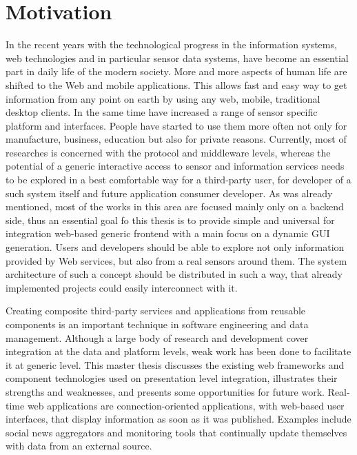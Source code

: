 \section{Motivation}
     In the recent years with the technological progress in the information systems, web technologies and in particular sensor data systems, have become an essential part in daily life of the modern society. More and more aspects of human life are shifted to the Web and mobile applications. This allows fast and easy way to get information from any point on earth by using any web, mobile, traditional desktop clients. In the same time have increased a range of sensor specific platform and interfaces. People have started to use them more often not only for manufacture, business, education but also for private reasons. Currently, most of researches is concerned with the protocol and middleware levels, whereas the potential of a generic interactive access to sensor and information services needs to be explored in a best comfortable way for a third-party user, for developer of a such system itself and future application consumer developer. As was already mentioned, most of the works in this area are focused mainly only on a backend side, thus an essential goal fo this thesis is to provide simple and universal for integration web-based generic frontend with a main focus on a dynamic GUI generation. Users and developers should be able to explore not only information provided by Web services, but also from a real sensors around them. The system architecture of such a concept should be distributed in such a way, that already implemented projects could easily interconnect with it.

     Creating composite third-party services and applications from reusable components is an important technique in software engineering and data management. Although a large body of research and development cover integration at the data and platform levels, weak work has been done to facilitate it at generic level. This master thesis discusses the existing web frameworks and component technologies used on presentation level integration, illustrates their strengths and weaknesses, and presents some opportunities for future work. Real-time web applications are connection-oriented applications, with web-based user interfaces, that display information as soon as it was published. Examples include social news aggregators and monitoring tools that continually update themselves with data from an external source.

